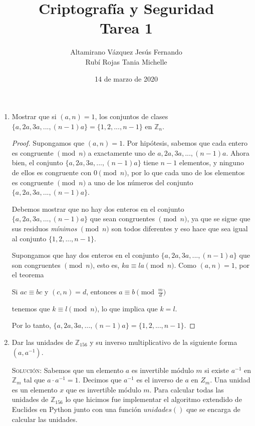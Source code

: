 \documentclass[letterpaper,11pt]{article}
\title{Criptografía y Seguridad \\ Tarea 1}
\author{Altamirano Vázquez Jesús Fernando \\
        Rubí Rojas Tania Michelle}
\date{14 de marzo de 2020}
\begin{document}
\maketitle

\begin{enumerate}
    \item Mostrar que si $(a, n) = 1$, los conjuntos de clases 
    $\{a,2a,3a,...,(n-1)a\} = \{1,2,...,n-1\}$ en $\mathbb{Z}_{n}$.
    \begin{proof}
        Supongamos que $(a, n) = 1$. Por hipótesis, sabemos que cada entero es
        congruente $\pmod{n}$ a exactamente uno de $a, 2a, 3a, ..., (n-1)a$.
        Ahora bien, el conjunto $\{a,2a,3a,...,(n-1)a\}$ tiene $n-1$ elementos,
        y ninguno de ellos es congruente con $0 \pmod{n}$, por lo que cada uno
        de los elementos es congruente $\pmod{n}$ a uno de los números del
        conjunto $\{a,2a,3a,...,(n-1)a\}$. 
        
        Debemos mostrar que no hay dos enteros en el conjunto 
        $\{a,2a,3a,...,(n-1)a\}$ que sean congruentes $\pmod{n}$, ya que se
        sigue que sus residuos \textit{mínimos} $\pmod{n}$ son todos diferentes 
        y eso hace que sea igual al conjunto $\{1,2,...,n-1\}$. 
        
        Supongamos que hay dos enteros en el conjunto $\{a,2a,3a,...,(n-1)a\}$ 
        que son congruentes $\pmod{n}$, esto es, $ka \equiv la \pmod{n}$. Como
        $(a, n) = 1$, por el teorema 
        \begin{center}
            Si $ac \equiv bc$ y $(c,n) = d$, entonces $a \equiv b 
            \pmod{\frac{m}{d}}$
        \end{center}
        
        tenemos que $k \equiv l \pmod{n}$, lo que implica que $k = l$.
        
        Por lo tanto, $\{a,2a,3a,...,(n-1)a\} = \{1,2,...,n-1\}$.
    
    \end{proof}

    
    \item Dar las unidades de $\mathbb{Z}_{156}$ y su inverso multiplicativo de
    la siguiente forma $(a, a^{-1})$.
    
    \textsc{Solución:} Sabemos que un elemento $a$ es invertible módulo $m$ si
    existe $a^{-1}$ en $\mathbb{Z}_{m}$ tal que $a \cdot a^{-1} = 1$. Decimos
    que $a^{-1}$ es el inverso de $a$ en $Z_{m}$. Una unidad es un elemento
    $x$ que es invertible módulo $m$. Para calcular todas las unidades de 
    $\mathbb{Z}_{156}$ lo que hicimos fue implementar el algoritmo extendido de
    Euclides en Python junto con una función $unidades()$ que se encarga de 
    calcular las unidades.
    

\end{enumerate}
\end{document}
